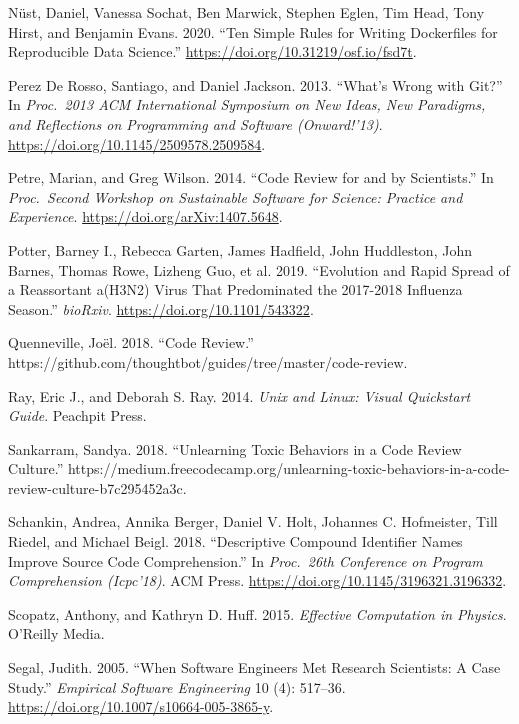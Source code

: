 \documentclass[
]{krantz}
\newlength{\cslhangindent}
\newenvironment{cslreferences}%
  {\setlength{\parindent}{0pt}%
  \everypar{\setlength{\hangindent}{\cslhangindent}}\ignorespaces}%
  {\par}
\begin{document}
\begin{cslreferences}
\leavevmode\hypertarget{ref-Nust2020}{}%
Nüst, Daniel, Vanessa Sochat, Ben Marwick, Stephen Eglen, Tim Head, Tony Hirst, and Benjamin Evans. 2020. ``Ten Simple Rules for Writing Dockerfiles for Reproducible Data Science.'' \url{https://doi.org/10.31219/osf.io/fsd7t}.

\leavevmode\hypertarget{ref-Pere2013}{}%
Perez De Rosso, Santiago, and Daniel Jackson. 2013. ``What's Wrong with Git?'' In \emph{Proc.~2013 ACM International Symposium on New Ideas, New Paradigms, and Reflections on Programming and Software (Onward!'13)}. \url{https://doi.org/10.1145/2509578.2509584}.

\leavevmode\hypertarget{ref-Petr2014}{}%
Petre, Marian, and Greg Wilson. 2014. ``Code Review for and by Scientists.'' In \emph{Proc.~Second Workshop on Sustainable Software for Science: Practice and Experience}. \url{https://doi.org/arXiv:1407.5648}.

\leavevmode\hypertarget{ref-Potter2019}{}%
Potter, Barney I., Rebecca Garten, James Hadfield, John Huddleston, John Barnes, Thomas Rowe, Lizheng Guo, et al. 2019. ``Evolution and Rapid Spread of a Reassortant a(H3N2) Virus That Predominated the 2017-2018 Influenza Season.'' \emph{bioRxiv}. \url{https://doi.org/10.1101/543322}.

\leavevmode\hypertarget{ref-Quen2018}{}%
Quenneville, Joël. 2018. ``Code Review.'' https://github.com/thoughtbot/guides/tree/master/code-review.

\leavevmode\hypertarget{ref-Ray2014}{}%
Ray, Eric J., and Deborah S. Ray. 2014. \emph{Unix and Linux: Visual Quickstart Guide}. Peachpit Press.

\leavevmode\hypertarget{ref-Sank2018}{}%
Sankarram, Sandya. 2018. ``Unlearning Toxic Behaviors in a Code Review Culture.'' https://medium.freecodecamp.org/unlearning-toxic-behaviors-in-a-code-review-culture-b7c295452a3c.

\leavevmode\hypertarget{ref-Scha2018}{}%
Schankin, Andrea, Annika Berger, Daniel V. Holt, Johannes C. Hofmeister, Till Riedel, and Michael Beigl. 2018. ``Descriptive Compound Identifier Names Improve Source Code Comprehension.'' In \emph{Proc.~26th Conference on Program Comprehension (Icpc'18)}. ACM Press. \url{https://doi.org/10.1145/3196321.3196332}.

\leavevmode\hypertarget{ref-Scop2015}{}%
Scopatz, Anthony, and Kathryn D. Huff. 2015. \emph{Effective Computation in Physics}. O'Reilly Media.

\leavevmode\hypertarget{ref-Sega2005}{}%
Segal, Judith. 2005. ``When Software Engineers Met Research Scientists: A Case Study.'' \emph{Empirical Software Engineering} 10 (4): 517--36. \url{https://doi.org/10.1007/s10664-005-3865-y}.


\end{cslreferences}
\end{document}
